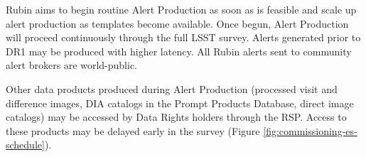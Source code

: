 Rubin aims to begin routine Alert Production as soon as is feasible and scale up alert production as templates become available.
Once begun, Alert Production will proceed continuously through the full LSST survey.
Alerts generated prior to DR1 may be produced with higher latency.
All Rubin alerts sent to community alert brokers are world-public.

Other data products produced during Alert Production (processed visit and difference images, DIA catalogs in the Prompt Products Database, direct image catalogs) may be accessed by Data Rights holders through the RSP.
Access to these products may be delayed early in the survey (Figure \ref{fig:commissioning-es-schedule}).